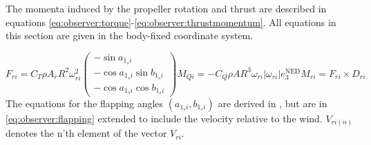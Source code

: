     The momenta induced by the propeller rotation and thrust
    are described in equations \eqref{eq:observer:torque}-\eqref{eq:observer:thrustmomentum}.
    All equations in this section are given in the body-fixed coordinate system.

    \begin{subequations}
        \begin{equation}
            \label{eq:observer:thrust}
            F_{ri} = C_{T} \rho A_{r} R^{2} \omega_{ri}^{2}\left(
                \begin{array}{c}
                    -\sin{a_{1_{s}i}} \\
                    -\cos{a_{1_{s}i}}\sin{b_{1_{s}i}} \\
                    -\cos{a_{1_{s}i}}\cos{b_{1_{s}i}}
                \end{array}\right)
        \end{equation}

        \begin{equation}
            \label{eq:observer:torque}
            M_{Qi} = -C_{Q} \rho A R^{3} \omega_{ri}|\omega_{ri}|e_{3}^{\text{NED}}
        \end{equation}

        \begin{equation}
            \label{eq:observer:thrustmomentum}
            M_{ri} = F_{ri} \times D_{ri}
        \end{equation}
    \end{subequations}
    The equations for the flapping angles $\left(a_{1_{s}i}, b_{1_{s}i}\right)$ are
    derived in \citep{Pounds_modellingand,prouty1995helicopter,leishman2002principles},
    but are in \eqref{eq:observer:flapping} extended to include the velocity relative to the wind.
    $V_{ri(n)}$ denotes the n'th element of the vector $V_{ri}$.
